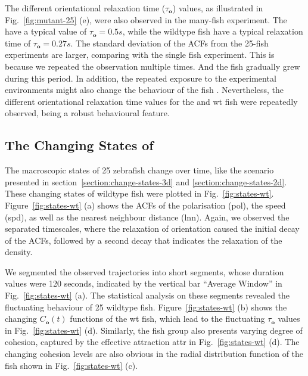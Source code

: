 \documentclass[11pt,twoside]{report}
\begin{document}
The different orientational relaxation time ($\tau_\mathbf{o}$) values, as illustrated in Fig.~\ref{fig:mutant-25} (e), were also observed in the many-fish experiment.
The {\mf} have a typical value of $\tau_\mathbf{o} = 0.5s$, while the wildtype fish have a typical relaxation time of $\tau_\mathbf{o} = 0.27s$.
The standard deviation of the ACFs from the 25-fish experiments are larger, comparing with the single fish experiment.
This is because we repeated the observation multiple times. And the fish gradually grew during this period. In addition, the repeated exposure to the experimental environments might also change the behaviour of the fish \cite{macgregor2021}. Nevertheless, the different orientational relaxation time values for the {\mf} and wt fish were repeatedly observed, being a robust behavioural feature.



\subsection{The Changing States of {\mf}}
\label{section:change-states-mutant}

The macroscopic states of 25 zebrafish change over time, like the scenario presented in section~\ref{section:change-states-3d} and \ref{section:change-states-2d}. These changing states of wildtype fish were plotted in Fig.~\ref{fig:states-wt}. Figure~\ref{fig:states-wt} (a) shows the ACFs of the polarisation (\gls{pol}), the speed (\gls{spd}), as well as the nearest neighbour distance (\gls{lnn}). Again, we observed the separated timescales, where the relaxation of orientation caused the initial decay of the ACFs, followed by a second decay that indicates the relaxation of the density. 

We segmented the observed trajectories into short segments, whose duration values were 120 seconds, indicated by the vertical bar ``Average Window'' in Fig.~\ref{fig:states-wt} (a). The statistical analysis on these segments revealed the fluctuating behaviour of 25 wildtype fish. Figure~\ref{fig:states-wt} (b) shows the changing $C_\mathbf{o}(t)$ functions of the wt fish, which lead to the fluctuating $\tau_\mathbf{o}$ values in Fig.~\ref{fig:states-wt} (d). Similarly, the fish group also presents varying degree of cohesion, captured by the effective attraction \gls{attr} in Fig.~\ref{fig:states-wt} (d). The changing cohesion levels are also obvious in the radial distribution function of the fish shown in Fig.~\ref{fig:states-wt} (c).
\end{document}
